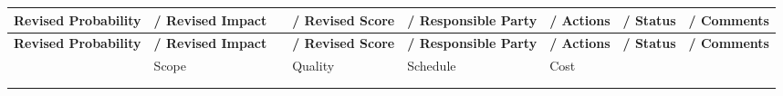 \documentclass[10pt,letterpaper]{article}
\renewcommand\arraystretch{1.25}
\newcommand{\smallsection}[1]{\par\Needspace{3\baselineskip}\vspace{5pt}{\normalsize\sffamily\bfseries\color{blue}#1}\par}
\begin{document}
\smallsection{Source table 2}
\begin{landscape}
\begin{center}
\begingroup
\setlength\tabcolsep{2.0pt}
\scriptsize
\renewcommand\arraystretch{1.55}
\begin{longtable}{|>{\raggedright\arraybackslash}p{1.026in}|>{\raggedright\arraybackslash}p{1.026in}|>{\raggedright\arraybackslash}p{1.026in}|>{\raggedright\arraybackslash}p{1.026in}|>{\raggedright\arraybackslash}p{1.026in}|>{\raggedright\arraybackslash}p{1.026in}|>{\raggedright\arraybackslash}p{1.026in}|>{\raggedright\arraybackslash}p{1.026in}|}
\hline
\rowcolor{light}
\textbf{Revised Probability} & \textbf{/ Revised Impact} & \rule{0pt}{11pt}\hspace{0pt} & \textbf{/ Revised Score} & \textbf{/ Responsible Party} & \textbf{/ Actions} & \textbf{/ Status} & \textbf{/ Comments} \\ \hline
\endfirsthead
\hline\rowcolor{light} \textbf{Revised Probability} & \textbf{/ Revised Impact} & \rule{0pt}{11pt}\hspace{0pt} & \textbf{/ Revised Score} & \textbf{/ Responsible Party} & \textbf{/ Actions} & \textbf{/ Status} & \textbf{/ Comments} \\ \hline
\endhead
\rule{0pt}{11pt}\hspace{0pt} & Scope & \rule{0pt}{11pt}\hspace{0pt} & Quality & Schedule & Cost & \rule{0pt}{11pt}\hspace{0pt} & \rule{0pt}{11pt}\hspace{0pt} \\ \hline
\rule{0pt}{11pt}\hspace{0pt} & \rule{0pt}{11pt}\hspace{0pt} & \rule{0pt}{11pt}\hspace{0pt} & \rule{0pt}{11pt}\hspace{0pt} & \rule{0pt}{11pt}\hspace{0pt} & \rule{0pt}{11pt}\hspace{0pt} & \rule{0pt}{11pt}\hspace{0pt} & \rule{0pt}{11pt}\hspace{0pt} \\ \hline
\rule{0pt}{11pt}\hspace{0pt} & \rule{0pt}{11pt}\hspace{0pt} & \rule{0pt}{11pt}\hspace{0pt} & \rule{0pt}{11pt}\hspace{0pt} & \rule{0pt}{11pt}\hspace{0pt} & \rule{0pt}{11pt}\hspace{0pt} & \rule{0pt}{11pt}\hspace{0pt} & \rule{0pt}{11pt}\hspace{0pt} \\ \hline

\end{longtable}
\end{center}
\end{landscape}
\end{document}
